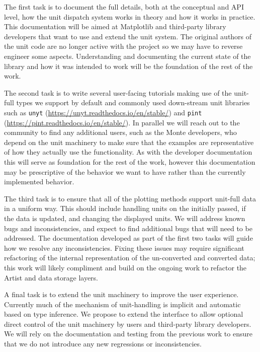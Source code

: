 \documentclass[12pt]{article}
\numberwithin{page}{section}
\begin{document}
The first task is to document the full details, both at the conceptual
and API level, how the unit dispatch system works in theory and how it
works in practice.  This documentation will be aimed at Matplotlib and
third-party library developers that want to use and extend the unit
system.  The original authors of the unit code are no longer active
with the project so we may have to reverse engineer some aspects.
Understanding and documenting the current state of the library and how
it was intended to work will be the foundation of the rest of the
work.

The second task is to write several user-facing tutorials making use
of the unit-full types we support by default and commonly used
down-stream unit libraries such as
\texttt{unyt} (\url{https://unyt.readthedocs.io/en/stable/})
and
\texttt{pint} (\url{https://pint.readthedocs.io/en/stable/}).
In parallel we will reach out to the community to find any additional
users, such as the Monte developers, who depend on the unit machinery
to make sure that the examples are representative of how they actually
use the functionality.  As with the developer documentation this will
serve as foundation for the rest of the work, however this
documentation may be prescriptive of the behavior we want to have
rather than the currently implemented behavior.

The third task is to ensure that all of the plotting methods support
unit-full data in a uniform way.  This should include handling units
on the initially passed, if the data is updated, and changing the
displayed units.  We will address known bugs and inconsistencies, and
expect to find additional bugs that will need to be addressed.  The
documentation developed as part of the first two tasks will guide how
we resolve any inconsistencies.  Fixing these issues may require
significant refactoring of the internal representation of the
un-converted and converted data; this work will likely compliment and
build on the ongoing work to refactor the Artist and data storage
layers.

A final task is to extend the unit machinery to improve the user
experience.  Currently much of the mechanism of unit-handling is
implicit and automatic based on type inference.  We propose to extend
the interface to allow optional direct control of the unit machinery
by users and third-party library developers.  We will rely on the
documentation and testing from the previous work to ensure that we do
not introduce any new regressions or inconsistencies.
\end{document}

